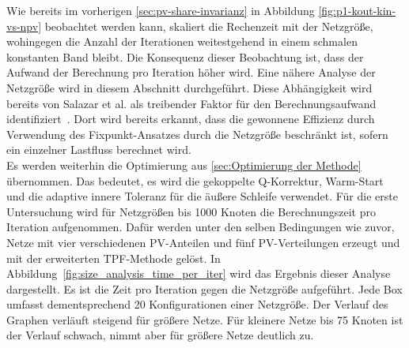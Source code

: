 %

Wie bereits im vorherigen \cref{sec:pv-share-invarianz} in Abbildung \ref{fig:p1-kout-kin-vs-npv} beobachtet werden kann, skaliert die Rechenzeit mit der Netzgröße, wohingegen die Anzahl der Iterationen weitestgehend in einem schmalen konstanten Band bleibt.
Die Konsequenz dieser Beobachtung ist, dass der Aufwand der Berechnung pro Iteration höher wird.
Eine nähere Analyse der Netzgröße wird in diesem Abschnitt durchgeführt.
Diese Abhängigkeit wird bereits von Salazar et al.  als treibender Faktor für den Berechnungsaufwand identifiziert~\cite{Salazar2024}.
Dort wird bereits erkannt, dass die gewonnene Effizienz durch Verwendung des Fixpunkt-Ansatzes durch die Netzgröße beschränkt ist, sofern ein einzelner Lastfluss berechnet wird.\\

Es werden weiterhin die Optimierung aus \cref{sec:Optimierung der Methode} übernommen. 
Das bedeutet, es wird die gekoppelte Q-Korrektur, Warm-Start und die adaptive innere Toleranz für die äußere Schleife verwendet.
Für die erste Untersuchung wird für Netzgrößen bis 1000 Knoten die Berechnungszeit pro Iteration aufgenommen. 
Dafür werden unter den selben Bedingungen wie zuvor, Netze mit vier verschiedenen PV-Anteilen und fünf PV-Verteilungen erzeugt und mit der erweiterten TPF-Methode gelöst.
In Abbildung~\ref{fig:size_analysis_time_per_iter} wird das Ergebnis dieser Analyse dargestellt.
Es ist die Zeit pro Iteration gegen die Netzgröße aufgeführt.
Jede Box umfasst dementsprechend 20 Konfigurationen einer Netzgröße.
Der Verlauf des Graphen verläuft steigend für größere Netze.
Für kleinere Netze bis 75 Knoten ist der Verlauf schwach, nimmt aber für größere Netze deutlich zu.\\

